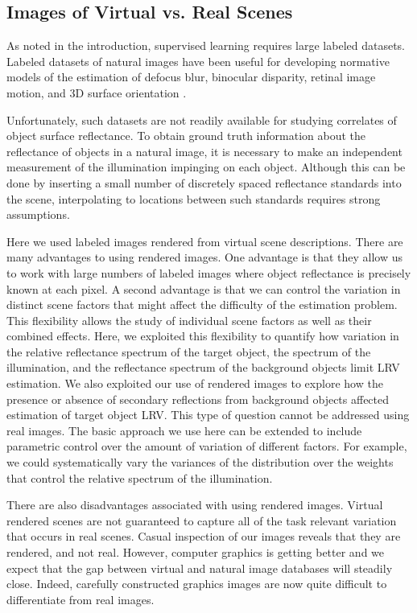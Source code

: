 \documentclass{jov}
\begin{document}
\subsection{Images of Virtual vs. Real Scenes}
As noted in the introduction, supervised learning requires large labeled datasets. Labeled datasets of natural images have been useful for developing normative models of the estimation of defocus blur, binocular disparity, retinal image motion, and 3D surface orientation \cite{burge2011optimal, burge2012optimal, burge2014optimal, burge2015optimal, kim2018lawful, burge2010natural, girshick2011cardinal, burge2016estimating, goncalves2017not}. 

Unfortunately, such datasets are not readily available for studying correlates of object surface reflectance.
To obtain ground truth information about the reflectance of objects in a natural image, it is necessary to make 
an independent measurement of the illumination impinging on each object.
Although this can be done by inserting a small number of discretely spaced reflectance standards into the scene, 
interpolating to locations between such standards requires strong assumptions.

Here we used labeled images rendered from virtual scene descriptions. 
There are many advantages to using rendered images.
One advantage is that they allow us to work with large numbers of labeled images where object reflectance is precisely known at each pixel.
A second advantage is that we can control the variation in distinct scene factors that might affect the difficulty of the estimation problem.
This flexibility allows the study of individual scene factors as well as their combined effects.
Here, we exploited this flexibility to quantify how variation in the relative reflectance spectrum of the target object, the spectrum of the illumination, and the reflectance spectrum of the background objects limit LRV estimation.
We also exploited our use of rendered images to explore how the presence or absence of secondary reflections from background objects affected estimation
of target object LRV.
This type of question cannot be addressed using real images.
The basic approach we use here can be extended to include parametric control over the amount of variation of different factors.
For example, we could systematically vary the variances of the distribution over the weights that control the relative spectrum
of the illumination.

There are also disadvantages associated with using rendered images. 
Virtual rendered scenes are not guaranteed to capture all of the task relevant variation that occurs in real scenes.
Casual inspection of our images reveals that they are rendered, and not real.
However, computer graphics is getting better and we expect that the gap between virtual and natural image databases will steadily close.
Indeed, carefully constructed graphics images are now quite difficult to differentiate from real images.
\end{document}
